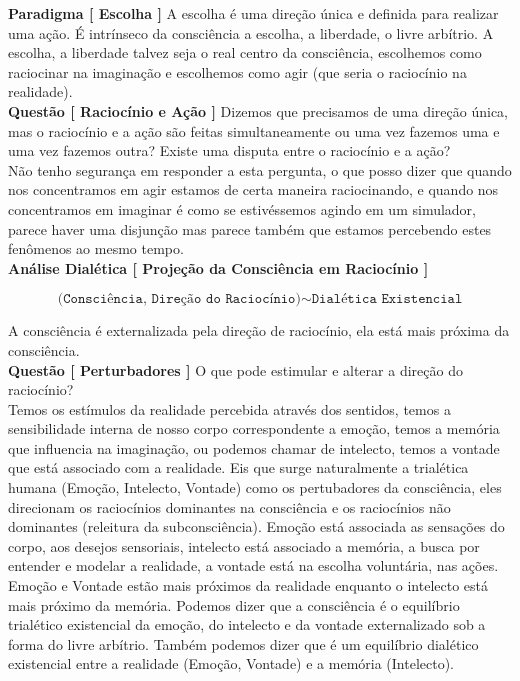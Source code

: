 \textbf{Paradigma [ Escolha ]} A escolha é uma direção única e definida para realizar uma ação. É intrínseco da consciência a escolha, a liberdade, o livre arbítrio. A escolha, a liberdade talvez seja o real centro da consciência, escolhemos como raciocinar na imaginação e escolhemos como agir (que seria o raciocínio na realidade).\\

\textbf{Questão [ Raciocínio e Ação ]} Dizemos que precisamos de uma direção única, mas o raciocínio e a ação são feitas simultaneamente ou uma vez fazemos uma e uma vez fazemos outra? Existe uma disputa entre o raciocínio e a ação?\\

Não tenho segurança em responder a esta pergunta, o que posso dizer que quando nos concentramos em agir estamos de certa maneira raciocinando, e quando nos concentramos em imaginar é como se estivéssemos agindo em um simulador, parece haver uma disjunção mas parece também que estamos percebendo estes fenômenos ao mesmo tempo.\\

\textbf{Análise Dialética [ Projeção da Consciência em Raciocínio ]}

$$ \texttt{(Consciência, Direção do Raciocínio)} \sim \texttt{Dialética Existencial} $$

\hrulefill

A consciência é externalizada pela direção de raciocínio, ela está mais próxima da consciência.\\

\textbf{Questão [ Perturbadores ]} O que pode estimular e alterar a direção do raciocínio?\\

Temos os estímulos da realidade percebida através dos sentidos, temos a sensibilidade interna de nosso corpo correspondente a emoção, temos a memória que influencia na imaginação, ou podemos chamar de intelecto, temos a vontade que está associado com a realidade. Eis que surge naturalmente a trialética humana (Emoção, Intelecto, Vontade) como os pertubadores da consciência, eles direcionam os raciocínios dominantes na consciência e os raciocínios não dominantes (releitura da subconsciência). Emoção está associada as sensações do corpo, aos desejos sensoriais, intelecto está associado a memória, a busca por entender e modelar a realidade, a vontade está na escolha voluntária, nas ações. Emoção e Vontade estão mais próximos da realidade enquanto o intelecto está mais próximo da memória. Podemos dizer que a consciência é o equilíbrio trialético existencial da emoção, do intelecto e da vontade externalizado sob a forma do livre arbítrio. Também podemos dizer que é um equilíbrio dialético existencial entre a realidade (Emoção, Vontade) e a memória (Intelecto).




